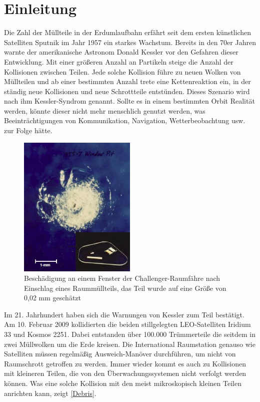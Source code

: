 \documentclass{article}
\begin{document}
\section{Einleitung}
Die Zahl der Müllteile in der Erdumlaufbahn erfährt seit dem ersten künstlichen Satelliten Sputnik im Jahr 1957 ein starkes Wachstum. Bereits in den 70er Jahren warnte der amerikanische Astronom Donald Kessler vor den Gefahren dieser Entwicklung. Mit einer größeren Anzahl an Partikeln steige die Anzahl der Kollisionen zwischen Teilen. Jede solche Kollision führe zu neuen Wolken von Müllteilen und ab einer bestimmten Anzahl trete eine Kettenreaktion ein, in der ständig neue Kollisionen und neue Schrottteile entstünden. Dieses Szenario wird nach ihm Kessler-Syndrom genannt. Sollte es in einem bestimmten Orbit Realität werden, könnte dieser nicht mehr menschlich genutzt werden, was Beeinträchtigungen von Kommunikation, Navigation, Wetterbeobachtung usw. zur Folge hätte. \\
\begin{figure}[H]
	\centering
	\includegraphics[width = 0.5\textwidth]{bilder/Debris.png}
	\caption{Beschädigung an einem Fenster der Challenger-Raumfähre nach Einschlag eines Raummüllteils, das Teil wurde auf eine Größe von 0,02 mm geschätzt \citep{carpenteruse}}
	\label{Debris}
\end{figure}
\noindent Im 21. Jahrhundert haben sich die Warnungen von Kessler zum Teil bestätigt. Am 10. Februar 2009 kollidierten die beiden stillgelegten LEO-Satelliten Iridium 33 und Kosmos 2251. Dabei entstanden über 100.000 Trümmerteile die seitdem in zwei Müllwolken um die Erde kreisen. Die International Raumstation genauso wie Satelliten müssen regelmäßig Ausweich-Manöver durchführen, um nicht von Raumschrott getroffen zu werden. Immer wieder kommt es auch zu Kollisionen mit kleineren Teilen, die von den Überwachungssystemen nicht verfolgt werden können. Was eine solche Kollision mit den meist mikroskopisch kleinen Teilen anrichten kann, zeigt \autoref{Debris}. \\\\
\end{document}
